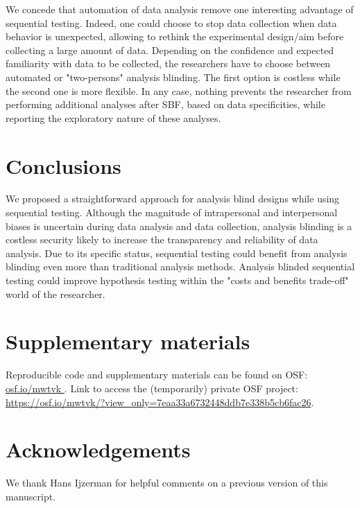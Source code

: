 \documentclass[a4paper,man,natbib,floatsintext,donotrepeattitle]{apa6}
\begin{document}
We concede that automation of data analysis remove one interesting advantage of sequential testing. Indeed, one could choose to stop data collection when data behavior is unexpected, allowing to rethink the experimental design/aim \citep{lakens_performing_2014} before collecting a large amount of data. Depending on the confidence and expected familiarity with data to be collected, the researchers have to choose between automated or "two-persons" analysis blinding. The first option is costless while the second one is more flexible. In any case, nothing prevents the researcher from performing additional analyses after SBF, based on data specificities, while reporting the exploratory nature of these analyses.

\section{Conclusions}


We proposed a straightforward approach for analysis blind designs while using sequential testing. Although the magnitude of intrapersonal and interpersonal biases is uncertain during data analysis and data collection, analysis blinding is a costless security likely to increase the transparency and reliability of data analysis. Due to its specific status, sequential testing could benefit from analysis blinding even more than traditional analysis methods. Analysis blinded sequential testing could improve hypothesis testing within the "costs and benefits trade-off" world of the researcher.

\section{Supplementary materials}\label{sec:supp}

Reproducible code and supplementary materials can be found on OSF: \url{osf.io/mwtvk
}. Link to access the (temporarily) private OSF project: \url{https://osf.io/mwtvk/?view_only=7eaa33a6732448ddb7e338b5cb6fac26}.

\section{Acknowledgements}

We thank Hans Ijzerman for helpful comments on a previous version of this manuscript.


\end{document}
